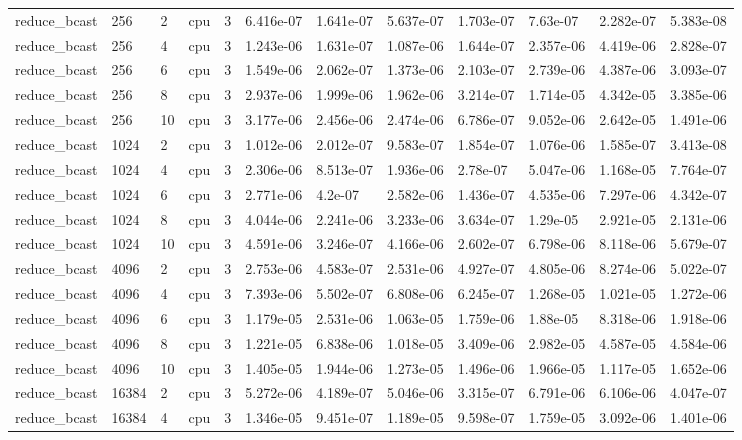 \begin{tabular}{llllllllllll}
reduce\_bcast & 256 & 2 & cpu & 3 & 6.416e-07 & 1.641e-07 & 5.637e-07 & 1.703e-07 & 7.63e-07 & 2.282e-07 & 5.383e-08 \\
reduce\_bcast & 256 & 4 & cpu & 3 & 1.243e-06 & 1.631e-07 & 1.087e-06 & 1.644e-07 & 2.357e-06 & 4.419e-06 & 2.828e-07 \\
reduce\_bcast & 256 & 6 & cpu & 3 & 1.549e-06 & 2.062e-07 & 1.373e-06 & 2.103e-07 & 2.739e-06 & 4.387e-06 & 3.093e-07 \\
reduce\_bcast & 256 & 8 & cpu & 3 & 2.937e-06 & 1.999e-06 & 1.962e-06 & 3.214e-07 & 1.714e-05 & 4.342e-05 & 3.385e-06 \\
reduce\_bcast & 256 & 10 & cpu & 3 & 3.177e-06 & 2.456e-06 & 2.474e-06 & 6.786e-07 & 9.052e-06 & 2.642e-05 & 1.491e-06 \\
reduce\_bcast & 1024 & 2 & cpu & 3 & 1.012e-06 & 2.012e-07 & 9.583e-07 & 1.854e-07 & 1.076e-06 & 1.585e-07 & 3.413e-08 \\
reduce\_bcast & 1024 & 4 & cpu & 3 & 2.306e-06 & 8.513e-07 & 1.936e-06 & 2.78e-07 & 5.047e-06 & 1.168e-05 & 7.764e-07 \\
reduce\_bcast & 1024 & 6 & cpu & 3 & 2.771e-06 & 4.2e-07 & 2.582e-06 & 1.436e-07 & 4.535e-06 & 7.297e-06 & 4.342e-07 \\
reduce\_bcast & 1024 & 8 & cpu & 3 & 4.044e-06 & 2.241e-06 & 3.233e-06 & 3.634e-07 & 1.29e-05 & 2.921e-05 & 2.131e-06 \\
reduce\_bcast & 1024 & 10 & cpu & 3 & 4.591e-06 & 3.246e-07 & 4.166e-06 & 2.602e-07 & 6.798e-06 & 8.118e-06 & 5.679e-07 \\
reduce\_bcast & 4096 & 2 & cpu & 3 & 2.753e-06 & 4.583e-07 & 2.531e-06 & 4.927e-07 & 4.805e-06 & 8.274e-06 & 5.022e-07 \\
reduce\_bcast & 4096 & 4 & cpu & 3 & 7.393e-06 & 5.502e-07 & 6.808e-06 & 6.245e-07 & 1.268e-05 & 1.021e-05 & 1.272e-06 \\
reduce\_bcast & 4096 & 6 & cpu & 3 & 1.179e-05 & 2.531e-06 & 1.063e-05 & 1.759e-06 & 1.88e-05 & 8.318e-06 & 1.918e-06 \\
reduce\_bcast & 4096 & 8 & cpu & 3 & 1.221e-05 & 6.838e-06 & 1.018e-05 & 3.409e-06 & 2.982e-05 & 4.587e-05 & 4.584e-06 \\
reduce\_bcast & 4096 & 10 & cpu & 3 & 1.405e-05 & 1.944e-06 & 1.273e-05 & 1.496e-06 & 1.966e-05 & 1.117e-05 & 1.652e-06 \\
reduce\_bcast & 16384 & 2 & cpu & 3 & 5.272e-06 & 4.189e-07 & 5.046e-06 & 3.315e-07 & 6.791e-06 & 6.106e-06 & 4.047e-07 \\
reduce\_bcast & 16384 & 4 & cpu & 3 & 1.346e-05 & 9.451e-07 & 1.189e-05 & 9.598e-07 & 1.759e-05 & 3.092e-06 & 1.401e-06 \\

\end{tabular}

